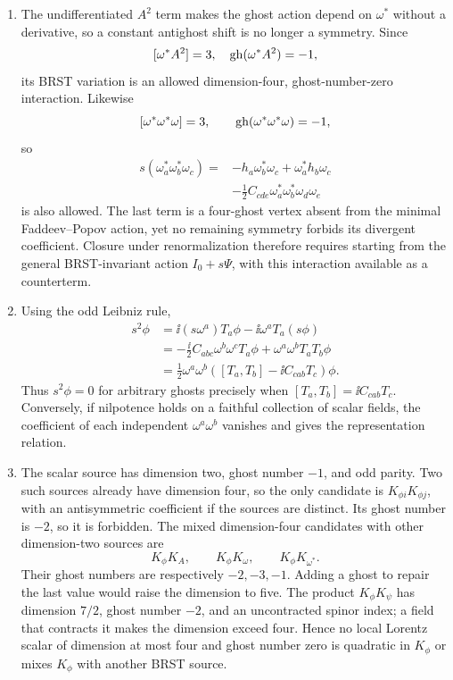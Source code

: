 \begin{enumerate}
  \begin{enumerate}
    \item[(a)]
    The undifferentiated \(A^2\) term makes the ghost action depend on
    \(\omega^*\) without a derivative, so a constant antighost shift is no
    longer a symmetry.  Since
    \[
      [\omega^*A^2]=3,\quad
      {\rm gh}(\omega^*A^2)=-1,
    \]
    its BRST variation is an allowed dimension-four, ghost-number-zero
    interaction.  Likewise
    \[
      [\omega^*\omega^*\omega]=3,\qquad
      {\rm gh}(\omega^*\omega^*\omega)=-1,
    \]
    so
    \[
    \begin{split}
      s(\omega_a^*\omega_b^*\omega_c)
        ={}&-h_a\omega_b^*\omega_c
          +\omega_a^*h_b\omega_c\\
         &-\frac12C_{cde}
          \omega_a^*\omega_b^*\omega_d\omega_e
    \end{split}
    \]
    is also allowed.  The last term is a four-ghost vertex absent from the
    minimal Faddeev--Popov action, yet no remaining symmetry forbids its
    divergent coefficient.  Closure under renormalization therefore
    requires starting from the general BRST-invariant action
    \(I_0+s\Psi\), with this interaction available as a counterterm.
    \item[(b)]
    Using the odd Leibniz rule,
    \[
    \begin{split}
      s^2\phi
        &=\ii(s\omega^a)T_a\phi
          -\ii\omega^a T_a(s\phi)\\
        &=-\frac{\ii}{2}C_{abc}
            \omega^b\omega^c T_a\phi
          +\omega^a\omega^b T_a T_b\phi\\
        &=\frac12\omega^a\omega^b
          \left([T_a,T_b]
            -\ii C_{cab}T_c\right)\phi .
    \end{split}
    \]
    Thus \(s^2\phi=0\) for arbitrary ghosts precisely when
    \([T_a,T_b]=\ii C_{cab}T_c\).  Conversely, if
    nilpotence holds on a faithful collection of scalar fields, the
    coefficient of each independent
    \(\omega^a\omega^b\) vanishes and gives the representation
    relation.
    \item[(c)]
    The scalar source has dimension two, ghost number \(-1\), and odd
    parity.  Two such sources already have dimension four, so the only
    candidate is
    \(K_{\phi i}K_{\phi j}\), with an antisymmetric coefficient if the
    sources are distinct.  Its ghost number is \(-2\), so it is forbidden.
    The mixed dimension-four candidates with other dimension-two sources
    are
    \[
      K_\phi K_A,\qquad K_\phi K_\omega,\qquad
      K_\phi K_{\omega^*}.
    \]
    Their ghost numbers are respectively \(-2,-3,-1\).  Adding a ghost to
    repair the last value would raise the dimension to five.  The product
    \(K_\phi K_\psi\) has dimension \(7/2\), ghost number \(-2\), and an
    uncontracted spinor index; a field that contracts it makes the dimension
    exceed four.  Hence no local Lorentz scalar of dimension at most four
    and ghost number zero is quadratic in \(K_\phi\) or mixes \(K_\phi\)
    with another BRST source.
  \end{enumerate}


\end{enumerate}
